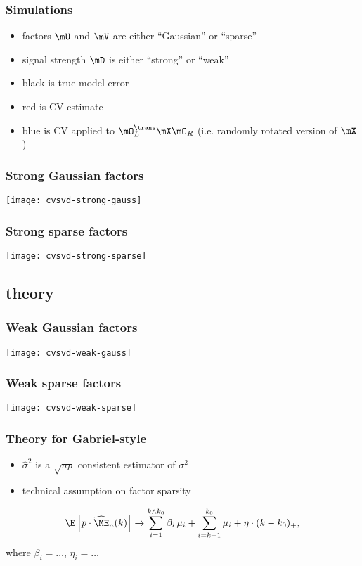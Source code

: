 \documentclass{beamer}
\begin{document}
\begin{frame}
  \frametitle{Simulations}
  \begin{itemize}
    \item factors $\mU$ and $\mV$ are either ``Gaussian'' or ``sparse''
    \item signal strength $\mD$ is either ``strong'' or ``weak''
    \item black is true model error
    \item red is CV estimate
    \item blue is CV applied to $\mO_L^\trans \mX \mO_R$ (i.e. randomly rotated version of $\mX$) 
  \end{itemize}
\end{frame}

\begin{frame}
  \frametitle{Strong Gaussian factors}
  \begin{center}
  \texttt{[image: cvsvd-strong-gauss]}
  \end{center}
\end{frame}

\begin{frame}
  \frametitle{Strong sparse factors}
  \begin{center}
  \texttt{[image: cvsvd-strong-sparse]}
  \end{center}
\end{frame}
\subsection{theory}

\begin{frame}
  \frametitle{Weak Gaussian factors}
  \begin{center}
  \texttt{[image: cvsvd-weak-gauss]}
  \end{center}
\end{frame}


\begin{frame}
  \frametitle{Weak sparse factors}
  \begin{center}
  \texttt{[image: cvsvd-weak-sparse]}
  \end{center}
\end{frame}

\begin{frame}
  \frametitle{Theory for Gabriel-style}
  \begin{itemize}
  \item $\hat \sigma^2$ is a $\sqrt{np}$ consistent estimator of $\sigma^2$
  \item technical assumption on factor sparsity
  \end{itemize}
  \begin{theorem}
  \[
\E \left[ p \cdot \widehat{\ME}_n(k) \right]
			\to
				\sum_{i=1}^{k \wedge k_0}
					\beta_i \, \mu_i
				+
				\sum_{i=k+1}^{k_0}
					\mu_i
				+
				\eta
				\cdot
				(k - k_0)_+,
  \]
  where $\beta_i = \ldots$, $\eta_i = \ldots$
  \end{theorem}
\end{frame}
\end{document}
